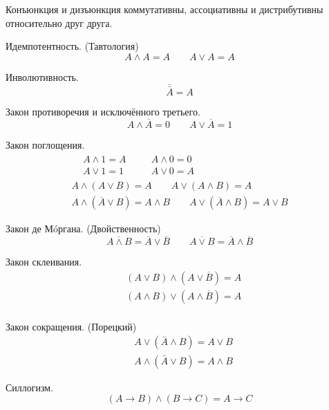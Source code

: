 Конъюнкция и дизъюнкция {\ital коммутативны}, {\ital ассоциативны} и {\ital дистрибутивны} относительно друг друга.
\begin{theorem}
{\bold Идемпотентность.} {\ital\color{desc} (Тавтология)}
$$A\land A=A\qquad A\lor A=A$$
\end{theorem}
\begin{theorem}
{\bold Инволютивность.}
$$\bar{\bar{A}}=A$$
\end{theorem}
\begin{theorem}
{\bold Закон противоречия} и {\bold исключённого третьего.}
$$A\land\overline{A}=0\qquad A\lor\overline{A}=1$$
\end{theorem}
\begin{theorem}
{\bold Закон поглощения.}
$$\begin{gathered}\begin{aligned}
&A\land 1=A &\quad &A\land 0=0\\
&A\lor 1=1 &\quad &A\lor 0=A
\end{aligned}\\
A\land (A\lor B)=A\qquad A\lor (A\land B)=A\\
A\land (\overline{A}\lor B)=A\land B\qquad A\lor (\overline{A}\land B)=A\lor B\end{gathered}$$
\end{theorem}
\begin{theorem}
{\bold Закон де Мóргана.} {\ital\color{desc} (Двойственность)}
$$\overline{A\land B}=\overline{A}\lor\overline{B}\qquad\overline{A\lor B}=\overline{A}\land\overline{B}$$
\end{theorem}
\begin{theorem}
{\bold Закон склеивания.}
$$\begin{aligned}
&(A\lor B)\land(A\lor \overline{B})=A\\
&(A\land B)\lor(A\land \overline{B})=A\\
\end{aligned}$$
\end{theorem}
\begin{theorem}
{\bold Закон сокращения.} {\ital\color{desc} (Порецкий)}
$$\begin{aligned}
&A\lor(\bar{A}\land B)=A\lor B\\
&A\land(\bar{A}\lor B)=A\land B
\end{aligned}$$
\end{theorem}
\begin{theorem}
{\bold Силлогизм.}
$$(A\to B)\land(B\to C)=A\to C$$
\end{theorem}

